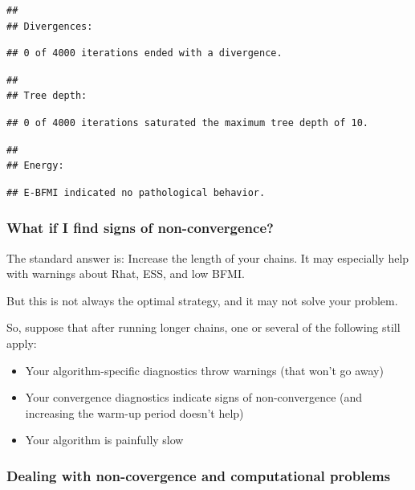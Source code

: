 \documentclass[
  11pt,
]{article}
\providecommand{\tightlist}{%
  \setlength{\itemsep}{0pt}\setlength{\parskip}{0pt}}
\begin{document}
\begin{verbatim}
## 
## Divergences:
\end{verbatim}

\begin{verbatim}
## 0 of 4000 iterations ended with a divergence.
\end{verbatim}

\begin{verbatim}
## 
## Tree depth:
\end{verbatim}

\begin{verbatim}
## 0 of 4000 iterations saturated the maximum tree depth of 10.
\end{verbatim}

\begin{verbatim}
## 
## Energy:
\end{verbatim}

\begin{verbatim}
## E-BFMI indicated no pathological behavior.
\end{verbatim}

\hypertarget{what-if-i-find-signs-of-non-convergence}{%
\subsubsection{What if I find signs of non-convergence?}\label{what-if-i-find-signs-of-non-convergence}}

The standard answer is: Increase the length of your chains. It may especially help with warnings about Rhat, ESS, and low BFMI.

But this is not always the optimal strategy, and it may not solve your problem.

So, suppose that after running longer chains, one or several of the following still apply:

\begin{itemize}
\tightlist
\item
  Your algorithm-specific diagnostics throw warnings (that won't go away)
\item
  Your convergence diagnostics indicate signs of non-convergence (and increasing the warm-up period doesn't help)
\item
  Your algorithm is painfully slow
\end{itemize}

\hypertarget{dealing-with-non-covergence-and-computational-problems}{%
\subsubsection{Dealing with non-covergence and computational problems}\label{dealing-with-non-covergence-and-computational-problems}}
\end{document}
